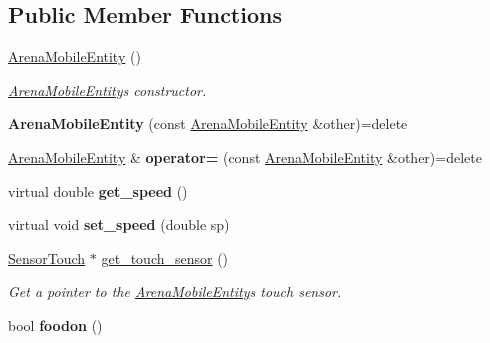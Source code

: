 \subsection*{Public Member Functions}
\begin{DoxyCompactItemize}
\item 
\hyperlink{class_arena_mobile_entity_a6d038ac71d9b149052fc5a0fec4907f9}{Arena\+Mobile\+Entity} ()\hypertarget{class_arena_mobile_entity_a6d038ac71d9b149052fc5a0fec4907f9}{}\label{class_arena_mobile_entity_a6d038ac71d9b149052fc5a0fec4907f9}

\begin{DoxyCompactList}\small\item\em \hyperlink{class_arena_mobile_entity}{Arena\+Mobile\+Entity}\textquotesingle{}s constructor. \end{DoxyCompactList}\item 
{\bfseries Arena\+Mobile\+Entity} (const \hyperlink{class_arena_mobile_entity}{Arena\+Mobile\+Entity} \&other)=delete\hypertarget{class_arena_mobile_entity_ad662f3efc1a56b64ecaf5633e7ff2139}{}\label{class_arena_mobile_entity_ad662f3efc1a56b64ecaf5633e7ff2139}

\item 
\hyperlink{class_arena_mobile_entity}{Arena\+Mobile\+Entity} \& {\bfseries operator=} (const \hyperlink{class_arena_mobile_entity}{Arena\+Mobile\+Entity} \&other)=delete\hypertarget{class_arena_mobile_entity_a34a7f0d094515cafff7611a0f6cf4eee}{}\label{class_arena_mobile_entity_a34a7f0d094515cafff7611a0f6cf4eee}

\item 
virtual double {\bfseries get\+\_\+speed} ()\hypertarget{class_arena_mobile_entity_a2116341414a3ad0449dc03efa6ea500b}{}\label{class_arena_mobile_entity_a2116341414a3ad0449dc03efa6ea500b}

\item 
virtual void {\bfseries set\+\_\+speed} (double sp)\hypertarget{class_arena_mobile_entity_a1a047f4377a9557516a2e1d6d73db849}{}\label{class_arena_mobile_entity_a1a047f4377a9557516a2e1d6d73db849}

\item 
\hyperlink{class_sensor_touch}{Sensor\+Touch} $\ast$ \hyperlink{class_arena_mobile_entity_ae9507f1b0c6bfdfd62afbab8a9a150f7}{get\+\_\+touch\+\_\+sensor} ()\hypertarget{class_arena_mobile_entity_ae9507f1b0c6bfdfd62afbab8a9a150f7}{}\label{class_arena_mobile_entity_ae9507f1b0c6bfdfd62afbab8a9a150f7}

\begin{DoxyCompactList}\small\item\em Get a pointer to the \hyperlink{class_arena_mobile_entity}{Arena\+Mobile\+Entity}\textquotesingle{}s touch sensor. \end{DoxyCompactList}\item 
bool {\bfseries foodon} ()\hypertarget{class_arena_mobile_entity_a1c39e636ebd97600afdaf1bf1df1315f}{}\label{class_arena_mobile_entity_a1c39e636ebd97600afdaf1bf1df1315f}


\end{DoxyCompactItemize}
